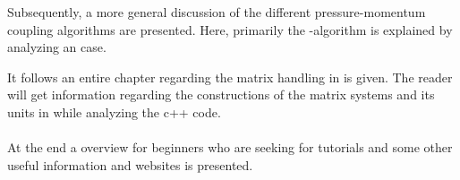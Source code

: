     Subsequently, a more general discussion of the different pressure-momentum
    coupling algorithms are presented. Here, primarily the \PIMPLE-algorithm is
    explained by analyzing an \OF case.


    It follows an entire chapter regarding the matrix handling in \OF is
    given. The reader will get information regarding the constructions of
    the matrix systems and its units in \OF while analyzing the c++ code.
%
%
\\~\\
%
%
    At the end a overview for \OF beginners who are seeking for tutorials
    and some other useful information and websites is presented.
%
%
